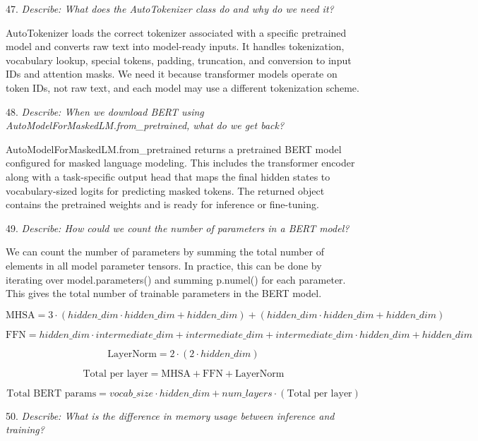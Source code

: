 47. \textit{Describe: What does the AutoTokenizer class do and why do we need it?}

AutoTokenizer loads the correct tokenizer associated with a specific pretrained model and converts raw text into model-ready inputs. It handles tokenization, vocabulary lookup, special tokens, padding, truncation, and conversion to input IDs and attention masks. We need it because transformer models operate on token IDs, not raw text, and each model may use a different tokenization scheme.

\vspace{1cm}

48. \textit{Describe: When we download BERT using AutoModelForMaskedLM.from\_pretrained, what do we get back?}

AutoModelForMaskedLM.from\_pretrained returns a pretrained BERT model configured for masked language modeling. This includes the transformer encoder along with a task-specific output head that maps the final hidden states to vocabulary-sized logits for predicting masked tokens. The returned object contains the pretrained weights and is ready for inference or fine-tuning.

\vspace{1cm}

49. \textit{Describe: How could we count the number of parameters in a BERT model?}

We can count the number of parameters by summing the total number of elements in all model parameter tensors. In practice, this can be done by iterating over model.parameters() and summing p.numel() for each parameter. This gives the total number of trainable parameters in the BERT model.

\[
\text{MHSA} =
3 \cdot (hidden\_dim \cdot hidden\_dim + hidden\_dim)
+
(hidden\_dim \cdot hidden\_dim + hidden\_dim)
\]

\[
\text{FFN} =
hidden\_dim \cdot intermediate\_dim + intermediate\_dim
+
intermediate\_dim \cdot hidden\_dim + hidden\_dim
\]

\[
\text{LayerNorm} = 2 \cdot (2 \cdot hidden\_dim)
\]

\[
\text{Total per layer} =
\text{MHSA} + \text{FFN} + \text{LayerNorm}
\]

\[
\text{Total BERT params} =
vocab\_size \cdot hidden\_dim
+
num\_layers \cdot (\text{Total per layer})
\]

\vspace{1cm}

50. \textit{Describe: What is the difference in memory usage between inference and training?}

